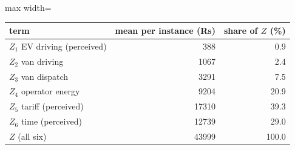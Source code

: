 \small
\begin{adjustbox}{max width=\linewidth}
\begin{tabular}{@{}lrr@{}}
\toprule
term & mean per instance (Rs) & share of $Z$ (\%) \\
\midrule
$Z_1$ EV driving (perceived) & 388 & 0.9 \\
$Z_2$ van driving & 1067 & 2.4 \\
$Z_3$ van dispatch & 3291 & 7.5 \\
$Z_4$ operator energy & 9204 & 20.9 \\
$Z_5$ tariff (perceived) & 17310 & 39.3 \\
$Z_6$ time (perceived) & 12739 & 29.0 \\
\midrule
$Z$ (all six) & 43999 & 100.0 \\
\bottomrule
\end{tabular}
\end{adjustbox}
